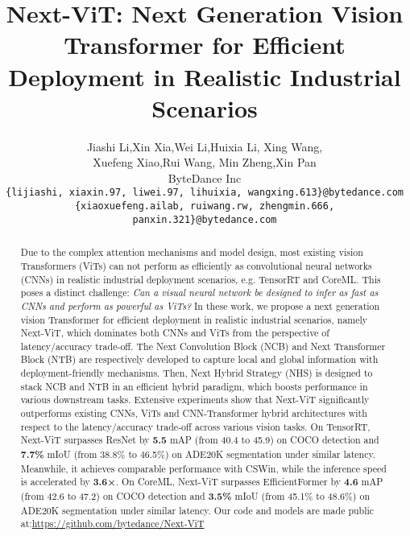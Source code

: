 \documentclass[10pt,twocolumn,letterpaper]{article}
\begin{document}
\title{Next-ViT: Next Generation Vision Transformer for Efficient Deployment in Realistic Industrial Scenarios}



\author{Jiashi Li\footnotemark[1],\qquad Xin Xia{\footnotemark[1]   \footnotemark[2]},\qquad Wei Li\footnotemark[1],\qquad Huixia Li, \qquad Xing Wang, \\
    {Xuefeng Xiao,\qquad Rui Wang, \qquad Min Zheng,\qquad Xin Pan}\\
 ByteDance Inc \\
 	{\tt\small \{lijiashi, xiaxin.97, liwei.97, lihuixia, wangxing.613\}@bytedance.com}\\
 	 	{\tt\small \{xiaoxuefeng.ailab, ruiwang.rw, zhengmin.666, panxin.321\}@bytedance.com}}
 	

\maketitle

\renewcommand{\thefootnote}{\fnsymbol{footnote}} 


\begin{abstract}
Due to the complex attention mechanisms and model design, most existing vision Transformers (ViTs) can not perform as efficiently as convolutional neural networks (CNNs) in realistic industrial deployment scenarios, e.g. TensorRT and CoreML. This poses a distinct challenge: 
\emph{Can a visual neural network be designed to infer as fast as CNNs and perform as powerful as ViTs?} In these work, we propose a next generation vision Transformer for efficient deployment in realistic industrial scenarios, namely Next-ViT, which dominates both CNNs and ViTs from the perspective of latency/accuracy trade-off. The Next Convolution Block (NCB) and Next Transformer Block (NTB) are respectively developed to capture local and global information with deployment-friendly mechanisms. Then, Next Hybrid Strategy (NHS) is designed to stack NCB and NTB in an efficient hybrid paradigm, which boosts performance in various downstream tasks. Extensive experiments show that Next-ViT significantly outperforms existing CNNs, ViTs and CNN-Transformer hybrid architectures with respect to the latency/accuracy trade-off across various vision tasks. On TensorRT, Next-ViT surpasses ResNet by \textbf{5.5} mAP (from 40.4 to 45.9) on COCO detection and \textbf{7.7\%} mIoU (from 38.8\% to 46.5\%) on ADE20K segmentation under similar latency. Meanwhile, it achieves comparable performance with CSWin, while the inference speed is accelerated by \textbf{3.6×}. On CoreML, Next-ViT surpasses EfficientFormer by \textbf{4.6} mAP (from 42.6 to 47.2) on COCO detection and \textbf{3.5\%} mIoU (from 45.1\% to 48.6\%) on ADE20K segmentation under similar latency. Our code and models are made public at:\url{https://github.com/bytedance/Next-ViT}
\end{abstract}
\end{document}
